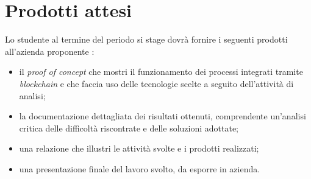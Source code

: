 
\section{Prodotti attesi}
	Lo studente al termine del periodo si stage dovrà fornire i seguenti prodotti all'azienda proponente \ragioneSocAzienda:
	\begin{itemize}
	    \item il \textit{proof of concept} che mostri il funzionamento dei processi integrati tramite \textit{blockchain} e che faccia uso delle tecnologie scelte a seguito dell’attività di analisi;
	    \item la documentazione dettagliata dei risultati ottenuti, comprendente un'analisi critica delle difficoltà riscontrate e delle soluzioni adottate;
	    \item una relazione che illustri le attività svolte e i prodotti realizzati;
	    \item una presentazione finale del lavoro svolto, da esporre in azienda.
	\end{itemize}
